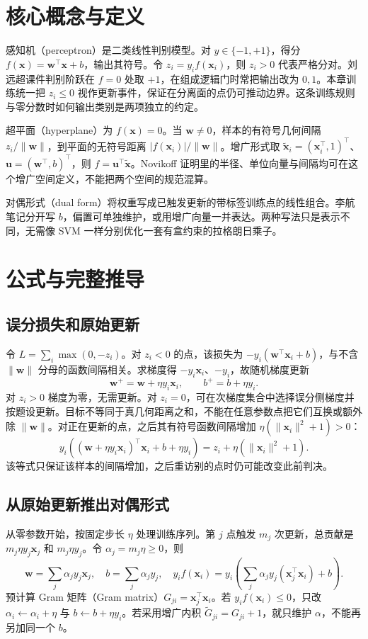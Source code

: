 \documentclass[UTF8,a4paper,zihao=-4,fontset=fandol]{ctexrep}
\begin{document}
\section{核心概念与定义}
感知机（perceptron）是二类线性判别模型。对 \(y\in\{-1,+1\}\)，得分 \(f(\bm x)=\bm w^\top\bm x+b\)，输出其符号。令 \(z_i=y_if(\bm x_i)\)，则 \(z_i>0\) 代表严格分对。刘远超课件判别阶跃在 \(f=0\) 处取 \(+1\)，在组成逻辑门时常把输出改为 \(0,1\)。本章训练统一把 \(z_i\le0\) 视作更新事件，保证在分离面的点仍可推动边界。这条训练规则与零分数时如何输出类别是两项独立的约定。

超平面（hyperplane）为 \(f(\bm x)=0\)。当 \(\bm w\ne0\)，样本的有符号几何间隔 \(z_i/\|\bm w\|\)，到平面的无符号距离 \(|f(\bm x_i)|/\|\bm w\|\)。增广形式取 \(\tilde{\bm x}_i=(\bm x_i^\top,1)^\top\)、\(\bm u=(\bm w^\top,b)^\top\)，则 \(f=\bm u^\top\tilde{\bm x}\)。Novikoff 证明里的半径、单位向量与间隔均可在这个增广空间定义，不能把两个空间的规范混算。

对偶形式（dual form）将权重写成已触发更新的带标签训练点的线性组合。李航笔记分开写 \(b\)，偏置可单独维护，或用增广向量一并表达。两种写法只是表示不同，无需像 SVM 一样分别优化一套有盒约束的拉格朗日乘子。

\section{公式与完整推导}
\subsection*{误分损失和原始更新}
令 \(L=\sum_i\max(0,-z_i)\)。对 \(z_i<0\) 的点，该损失为 \(-y_i(\bm w^\top\bm x_i+b)\)，与不含 \(\|\bm w\|\) 分母的函数间隔相关。求梯度得 \(-y_i\bm x_i\)、\(-y_i\)，故随机梯度更新
\[
 \bm w^+=\bm w+\eta y_i\bm x_i,\qquad b^+=b+\eta y_i.
\]
对 \(z_i>0\) 梯度为零，无需更新。对 \(z_i=0\)，可在次梯度集合中选择误分侧梯度并按题设更新。目标不等同于真几何距离之和，不能在任意参数点把它们互换或额外除 \(\|\bm w\|\)。对正在更新的点，之后其有符号函数间隔增加 \(\eta(\|\bm x_i\|^2+1)>0\)：
\[
 y_i((\bm w+\eta y_i\bm x_i)^\top\bm x_i+b+\eta y_i)
   =z_i+\eta(\|\bm x_i\|^2+1).
\]
该等式只保证该样本的间隔增加，之后重访别的点时仍可能改变此前判决。

\subsection*{从原始更新推出对偶形式}
从零参数开始，按固定步长 \(\eta\) 处理训练序列。第 \(j\) 点触发 \(m_j\) 次更新，总贡献是 \(m_j\eta y_j\bm x_j\) 和 \(m_j\eta y_j\)。令 \(\alpha_j=m_j\eta\ge0\)，则
\[
 \bm w=\sum_j\alpha_jy_j\bm x_j,\quad
 b=\sum_j\alpha_jy_j,\quad
 y_if(\bm x_i)=y_i\left(\sum_j\alpha_j y_j(\bm x_j^\top\bm x_i)+b\right).
\]
预计算 Gram 矩阵（Gram matrix）\(G_{ji}=\bm x_j^\top\bm x_i\)。若 \(y_if(\bm x_i)\le0\)，只改 \(\alpha_i\gets\alpha_i+\eta\) 与 \(b\gets b+\eta y_i\)。若采用增广内积 \(\tilde G_{ji}=G_{ji}+1\)，就只维护 \(\alpha\)，不能再另加同一个 \(b\)。
\end{document}

